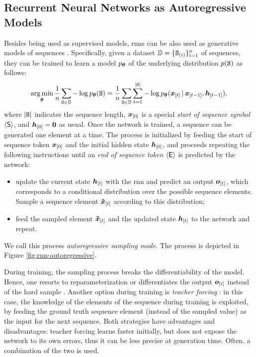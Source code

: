 \subsection{Recurrent Neural Networks as Autoregressive Models}
Besides being used as supervised models, \glspl{rnn} can be also used as generative models of sequences \cite{graves2013generating}. Specifically, given a dataset $\Data = \{\PatternGraph{S}{i}\}_{i=1}^n$ of sequences, they can be trained to learn a model $p_{\boldsymbol{\theta}}$ of the underlying distribution $p(\AttrGraph{s})$ as follows:
$$\argmin_{\Param} \frac{1}{n} \sum_{\AttrGraph{s} \in \Data} - \log p_{\Param}(\AttrGraph{s}) = \frac{1}{n} \sum_{\AttrGraph{s} \in \Data} \sum_{t=1}^{|\AttrGraph{s}|} - \log p_{\Param}(\Elem{x}{t} \given \Elem{x}{t-1}, \Elem{h}{t-1}),$$
where $|\AttrGraph{S}|$ indicates the sequence length, $\Elem{x}{0}$ is a special \emph{start of sequence symbol} $\mathsf{\langle S \rangle}$, and $\Elem{h}{0} = \Zeros$ as usual. Once the network is trained, a sequence can be generated one element at a time. The process is initialized by feeding the start of sequence token $\Elem{x}{0}$ and the initial hidden state $\Elem{h}{0}$, and proceeds repeating the following instructions until an \emph{end of sequence token} $\langle \mathsf{E} \rangle$ is predicted by the network:
\begin{itemize}
    \item update the current state $\Elem{h}{t}$ with the \gls{rnn} and predict an output $\Elem{o}{t}$, which corresponds to a conditional distribution over the possible sequence elements. Sample a sequence element $\Elem{\tilde{x}}{t}$ according to this distribution;
    \item feed the sampled element $\Elem{\tilde{x}}{t}$ and the updated state $\Elem{h}{t}$ to the network and repeat.
\end{itemize}
We call this process \emph{autoregressive sampling mode}. The process is depicted in Figure \ref{fig:rnn-autoregressive}.
\begin{figure*}[h!]
    \centering
    \resizebox{.7\textwidth}{!}{}
    \caption{An example of training a recurrent neural network for learning an autoregressive distribution. The dashed arrows indicate non-differentiable operations.}
    \label{fig:rnn-autoregressive}
\end{figure*}
During training, the sampling process breaks the differentiability of the model. Hence, one resorts to reparameterization \citep{jang2017gumbel} or differentiates the output $\Elem{o}{t}$ instead of the hard sample \citep{bengio2013straighttrough}. Another option during training is \emph{teacher forcing} \citep{williams1989teacherforcing}: in this case, the knowledge of the elements of the sequence during training is exploited, by feeding the ground truth sequence element (instead of the sampled value) as the input for the next sequence. Both strategies have advantages and disadvantages: teacher forcing learns faster initially, but does not expose the network to its own errors, thus it can be less precise at generation time. Often, a combination of the two is used.
